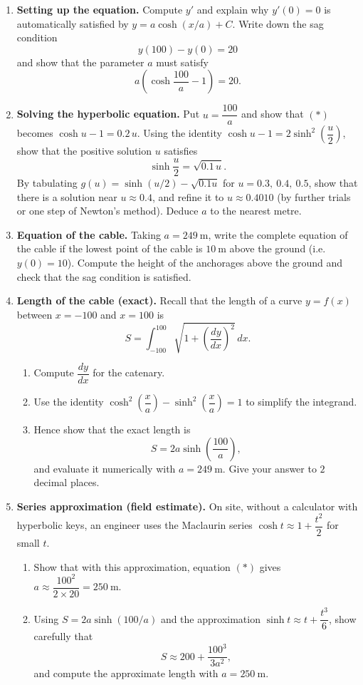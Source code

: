 \documentclass[11pt]{article}
\begin{document}
\begin{enumerate}
\item \textbf{Setting up the equation.} Compute $y'$ and explain why $y'(0) = 0$ is automatically satisfied by $y = a\cosh(x/a) + C$. Write down the sag condition
\[ y(100) - y(0) = 20 \]
and show that the parameter $a$ must satisfy
\[ a\left(\cosh\frac{100}{a} - 1\right) = 20. \tag{$\ast$} \]

\item \textbf{Solving the hyperbolic equation.} Put $u = \dfrac{100}{a}$ and show that $(\ast)$ becomes $\cosh u - 1 = 0.2\,u$. Using the identity $\cosh u - 1 = 2\sinh^2\!\left(\dfrac{u}{2}\right)$, show that the positive solution $u$ satisfies
\[ \sinh\frac{u}{2} = \sqrt{0.1\,u}. \]
By tabulating $g(u) = \sinh(u/2) - \sqrt{0.1u}$ for $u = 0.3,\ 0.4,\ 0.5$, show that there is a solution near $u \approx 0.4$, and refine it to $u \approx 0.4010$ (by further trials or one step of Newton's method). Deduce $a$ to the nearest metre.

\item \textbf{Equation of the cable.} Taking $a = 249\ \mathrm{m}$, write the complete equation of the cable if the lowest point of the cable is $10\ \mathrm{m}$ above the ground (i.e. $y(0) = 10$). Compute the height of the anchorages above the ground and check that the sag condition is satisfied.

\item \textbf{Length of the cable (exact).} Recall that the length of a curve $y = f(x)$ between $x = -100$ and $x = 100$ is
\[ S = \int_{-100}^{100} \sqrt{1 + \left(\frac{dy}{dx}\right)^2}\, dx. \]
\begin{enumerate}
\item Compute $\dfrac{dy}{dx}$ for the catenary.
\item Use the identity $\cosh^2\!\left(\dfrac{x}{a}\right) - \sinh^2\!\left(\dfrac{x}{a}\right) = 1$ to simplify the integrand.
\item Hence show that the exact length is
\[ S = 2a\sinh\!\left(\frac{100}{a}\right), \]
and evaluate it numerically with $a = 249\ \mathrm{m}$. Give your answer to $2$ decimal places.
\end{enumerate}

\item \textbf{Series approximation (field estimate).} On site, without a calculator with hyperbolic keys, an engineer uses the Maclaurin series $\cosh t \approx 1 + \dfrac{t^2}{2}$ for small $t$.
\begin{enumerate}
\item Show that with this approximation, equation $(\ast)$ gives $a \approx \dfrac{100^2}{2\times 20} = 250\ \mathrm{m}$.
\item Using $S = 2a\sinh(100/a)$ and the approximation $\sinh t \approx t + \dfrac{t^3}{6}$, show carefully that
\[ S \approx 200 + \frac{100^3}{3a^2}, \]
and compute the approximate length with $a = 250\ \mathrm{m}$.
\end{enumerate}


\end{enumerate}
\end{document}
